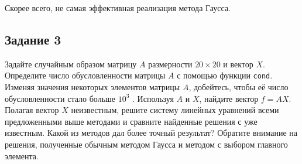 \documentclass[11pt]{article}
\begin{document}
    Скорее всего, не самая эффективная реализация метода Гаусса.

    \hypertarget{ux437ux430ux434ux430ux43dux438ux435-3}{%
\subsection{Задание 3}\label{ux437ux430ux434ux430ux43dux438ux435-3}}

Задайте случайным образом матрицу \(A\) размерности \(20 × 20\) и вектор
\(X\). Определите число обусловленности матрицы \(A\) с помощью функции
\texttt{cond}. Изменяя значения некоторых элементов матрицы \(A\),
добейтесь, чтобы её число обусловленности стало больше \(10^3\) .
Используя \(A\) и \(X\), найдите вектор \(f = AX\). Полагая вектор \(X\)
неизвестным, решите систему линейных уравнений всеми предложенными выше
методами и сравните найденные решения с уже известным. Какой из методов
дал более точный результат? Обратите внимание на решения, полученные
обычным методом Гаусса и методом с выбором главного элемента.
\end{document}
